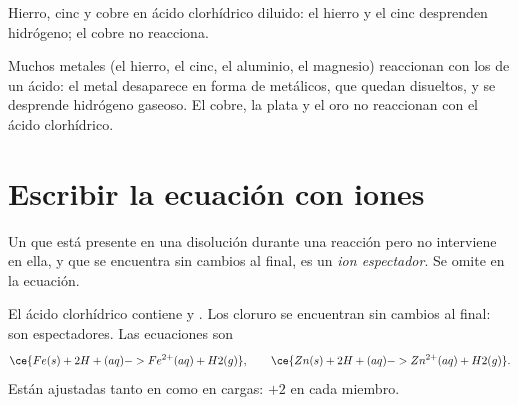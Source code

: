 \begin{omfigure}

{\small Hierro, cinc y cobre en ácido clorhídrico diluido: el hierro y el
cinc desprenden hidrógeno; el cobre no reacciona.}
\end{omfigure}

\begin{proposition}\label{prop:g9:metals-acids-corrosion:acid}
Muchos metales (el hierro, el cinc, el aluminio, el magnesio) reaccionan
con los   de un ácido: el metal desaparece en forma de 
metálicos, que quedan disueltos, y se desprende hidrógeno gaseoso. El
cobre, la plata y el oro no reaccionan con el ácido clorhídrico.
\end{proposition}

\section{Escribir la ecuación con iones}

\begin{definition}\label{def:g9:metals-acids-corrosion:spectator}
Un  que está presente en una disolución durante una reacción pero no
interviene en ella, y que se encuentra sin cambios al final, es un
\emph{ion espectador}. Se omite en la ecuación.
\end{definition}

\begin{example}\label{ex:g9:metals-acids-corrosion:iron}
El ácido clorhídrico contiene   y . Los
 cloruro se encuentran sin cambios al final: son espectadores. Las
ecuaciones son
\[
  \ce{Fe(s) + 2H+(aq) -> Fe^{2+}(aq) + H2(g)}, \qquad
  \ce{Zn(s) + 2H+(aq) -> Zn^{2+}(aq) + H2(g)}.
\]
Están ajustadas tanto en  como en cargas: $+2$ en cada miembro.
\end{example}

